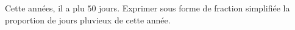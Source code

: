 
\begin{exercice}\label{exosmath-0800}

    Cette années, il a plu \( 50\) jours. Exprimer sous forme de fraction simplifiée la proportion de jours pluvieux de cette année.

\end{exercice}
